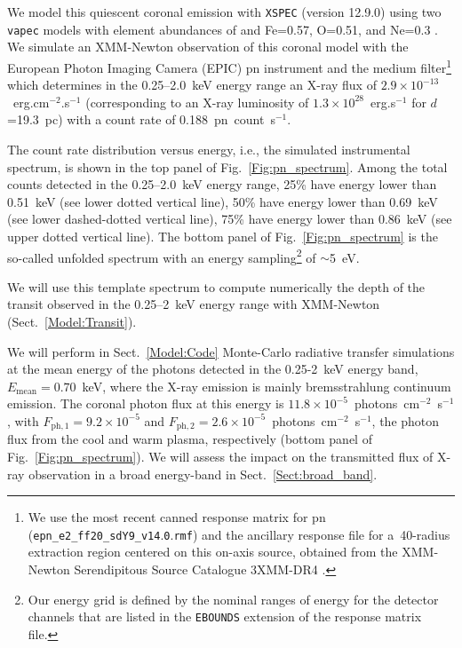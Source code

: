 \documentclass[iop]{emulateapj}
\begin{document}
We model this quiescent coronal emission with {\tt XSPEC} (version 12.9.0) using two {\tt vapec} models \citep{Smith2001}
with element abundances of \cite{Anders1989} and Fe=0.57, O=0.51, and Ne=0.3 \citep{Pillitteri2011}. We simulate an XMM-Newton 
observation of this coronal model with the European Photon Imaging Camera (EPIC) pn instrument \citep{Struder2001}
and the medium filter\footnote{We use the most recent canned response matrix for pn ({\tt epn\_e2\_ff20\_sdY9\_v14$.$0$.$rmf}) 
and the ancillary response file for a~40\arcsec-radius extraction region centered on this on-axis source, obtained 
from the XMM-Newton Serendipitous Source Catalogue 3XMM-DR4 \citep{Watson2009}.} \citep{Struder2001} which determines in the 
0.25--2.0~keV energy range an X-ray flux of $2.9\times 10^{-13}$~erg.cm$^{-2}$.s$^{-1}$ (corresponding to an X-ray luminosity 
of $1.3\times 10^{28}$~erg.s$^{-1}$ for $d$=19.3~pc) with a count rate of 0.188~pn~count~s$^{-1}$.

The count rate distribution versus energy, i.e., the simulated instrumental spectrum, is shown in the top panel of
Fig.~\ref{Fig:pn_spectrum}. Among the total counts detected in the 0.25--2.0~keV energy range, 25\% have energy lower than
0.51~keV (see lower dotted vertical line), 50\% have energy lower than 0.69~keV (see lower dashed-dotted vertical line),
75\% have energy lower than 0.86~keV (see upper dotted vertical line). The bottom panel of Fig.~\ref{Fig:pn_spectrum} is 
the so-called unfolded spectrum with an energy sampling\footnote{Our energy grid is defined by the nominal ranges of energy 
for the detector channels that are listed in the {\tt EBOUNDS} extension of the response matrix file.} of $\sim$5~eV.

We will use this template spectrum to compute numerically the depth of the transit observed in the 0.25--2~keV energy 
range with XMM-Newton (Sect.~\ref{Model:Transit}).

We will perform in Sect.~\ref{Model:Code} Monte-Carlo radiative transfer simulations at the mean energy of the photons detected 
in the 0.25-2~keV energy band, $E_\mathrm{mean}=0.70$~keV, where the X-ray emission is mainly bremsstrahlung continuum emission.
The coronal photon flux at this energy is $11.8\times10^{-5}$~photons~cm$^{-2}$~s$^{-1}$, with $F_\mathrm{ph,1}=9.2\times10^{-5}$ and 
$F_\mathrm{ph,2}=2.6\times10^{-5}$~photons~cm$^{-2}$~s$^{-1}$, the photon flux from the cool and warm plasma, respectively (bottom panel of 
Fig.~\ref{Fig:pn_spectrum}). We will assess the impact on the transmitted flux of X-ray observation in a broad energy-band in 
Sect.~\ref{Sect:broad_band}.
\end{document}
